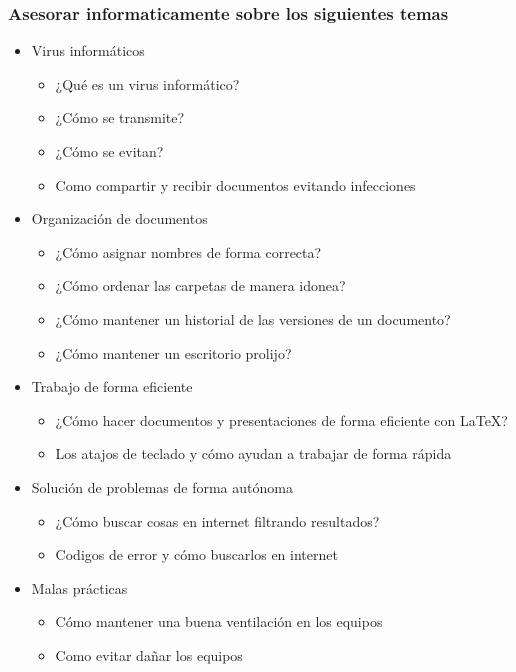 \documentclass{article}
\begin{document}
		\subsubsection{Asesorar informaticamente sobre los siguientes temas}
			\begin{itemize}
			\item Virus informáticos
				\begin{itemize}
				\item ¿Qué es un virus informático?
				\item ¿Cómo se transmite?
				\item ¿Cómo se evitan?
				\item Como compartir y recibir documentos evitando infecciones
				\end{itemize}
			
			\item Organización de documentos
				\begin{itemize}
				\item ¿Cómo asignar nombres de forma correcta?
				\item ¿Cómo ordenar las carpetas de manera idonea?
				\item ¿Cómo mantener un historial de las versiones de un documento?
				\item ¿Cómo mantener un escritorio prolijo?
				\end{itemize}
			
			\item Trabajo de forma eficiente
				\begin{itemize}
				\item ¿Cómo hacer documentos y presentaciones de forma eficiente con {\LaTeX}?
				\item Los atajos de teclado y cómo ayudan a trabajar de forma rápida
				\end{itemize}
			
			\item Solución de problemas de forma autónoma
			 	\begin{itemize}
			 	\item ¿Cómo buscar cosas en internet filtrando resultados?
			 	\item Codigos de error y cómo buscarlos en internet
			 	\end{itemize}		
			
			\item Malas prácticas
				\begin{itemize}
				\item Cómo mantener una buena ventilación en los equipos
				\item Como evitar dañar los equipos
				\end{itemize}	
			\end{itemize}			
		\newpage	
		
\end{document}
